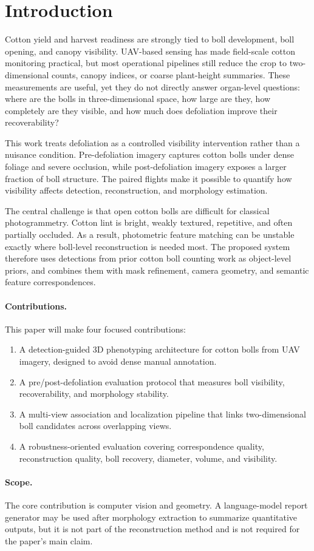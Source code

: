 \section{Introduction}

Cotton yield and harvest readiness are strongly tied to boll development, boll opening, and canopy visibility. UAV-based sensing has made field-scale cotton monitoring practical, but most operational pipelines still reduce the crop to two-dimensional counts, canopy indices, or coarse plant-height summaries. These measurements are useful, yet they do not directly answer organ-level questions: where are the bolls in three-dimensional space, how large are they, how completely are they visible, and how much does defoliation improve their recoverability?

This work treats defoliation as a controlled visibility intervention rather than a nuisance condition. Pre-defoliation imagery captures cotton bolls under dense foliage and severe occlusion, while post-defoliation imagery exposes a larger fraction of boll structure. The paired flights make it possible to quantify how visibility affects detection, reconstruction, and morphology estimation.

The central challenge is that open cotton bolls are difficult for classical photogrammetry. Cotton lint is bright, weakly textured, repetitive, and often partially occluded. As a result, photometric feature matching can be unstable exactly where boll-level reconstruction is needed most. The proposed system therefore uses detections from prior cotton boll counting work as object-level priors, and combines them with mask refinement, camera geometry, and semantic feature correspondences.

\paragraph{Contributions.}
This paper will make four focused contributions:
\begin{enumerate}
    \item A detection-guided 3D phenotyping architecture for cotton bolls from UAV imagery, designed to avoid dense manual annotation.
    \item A pre/post-defoliation evaluation protocol that measures boll visibility, recoverability, and morphology stability.
    \item A multi-view association and localization pipeline that links two-dimensional boll candidates across overlapping views.
    \item A robustness-oriented evaluation covering correspondence quality, reconstruction quality, boll recovery, diameter, volume, and visibility.
\end{enumerate}

\paragraph{Scope.}
The core contribution is computer vision and geometry. A language-model report generator may be used after morphology extraction to summarize quantitative outputs, but it is not part of the reconstruction method and is not required for the paper's main claim.
